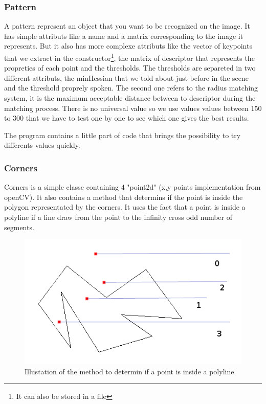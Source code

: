 \documentclass[english,a4paper,11pt]{report}
\begin{document}
	\subsubsection{Pattern}
	\par A pattern represent an object that you want to be recognized on the image. It has simple attributs like a name and a matrix corresponding to the image it represents. But it also has more complexe attributs like the vector of keypoints that we extract in the constructor\footnote{It can also be stored in a file}, the matrix of descriptor that represents the propreties of each point and the thresholds. The thresholds are separeted in two different attributs, the minHessian that we told about just before in the scene and the threshold proprely spoken. The second one refers to the radius matching system, it is the maximum acceptable distance between to descriptor during the matching process. There is no universal value so we use values values between 150 to 300 that we have to test one by one to see which one gives the best results.
	\par The program contains a little part of code that brings the possibility to try differents values quickly.
	
	
	\subsubsection{Corners}
	\par Corners is a simple classe containing 4 "point2d" (x,y points implementation from openCV).
	It also contains a method that determins if the point is inside the polygon representated by the corners. It uses the fact that a point is inside a polyline if a line draw from the point to the infinity cross odd number of segments.
	\begin{figure}[h]
		\begin{center}
			\includegraphics[scale=0.7]{images_not_compressed/isIn.png}
			\caption{Illustation of the method to determin if a point is inside a polyline}
		\end{center}
	\end{figure}
		
	
	
	

	\listoffigures

	{}
	
	
\end{document}

